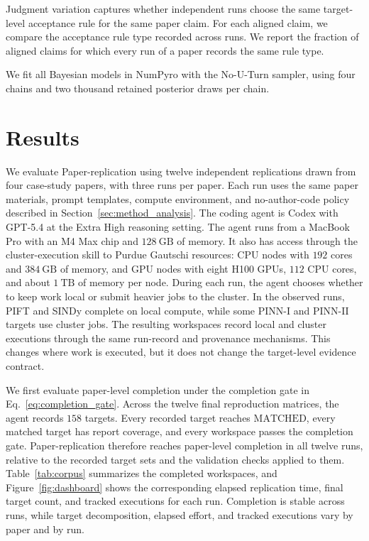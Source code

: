 \documentclass[authoryear,5p,times,nopreprintline]{elsarticle}
\begin{document}
Judgment variation captures whether independent runs choose the same target-level acceptance rule for the same paper claim.
For each aligned claim, we compare the acceptance rule type recorded across runs.
We report the fraction of aligned claims for which every run of a paper records the same rule type.

We fit all Bayesian models in NumPyro with the No-U-Turn sampler, using four chains and two thousand retained posterior draws per chain.

\section{Results}\label{sec:results}
We evaluate Paper-replication using twelve independent replications drawn from four case-study papers, with three runs per paper.
Each run uses the same paper materials, prompt templates, compute environment, and no-author-code policy described in Section~\ref{sec:method_analysis}.
The coding agent is Codex with GPT-5.4 at the Extra High reasoning setting.
The agent runs from a MacBook Pro with an M4 Max chip and \(128~\mathrm{GB}\) of memory.
It also has access through the cluster-execution skill to Purdue Gautschi resources: CPU nodes with \(192\) cores and \(384~\mathrm{GB}\) of memory, and GPU nodes with eight H100 GPUs, \(112\) CPU cores, and about \(1~\mathrm{TB}\) of memory per node.
During each run, the agent chooses whether to keep work local or submit heavier jobs to the cluster.
In the observed runs, PIFT and SINDy complete on local compute, while some PINN-I and PINN-II targets use cluster jobs.
The resulting workspaces record local and cluster executions through the same run-record and provenance mechanisms.
This changes where work is executed, but it does not change the target-level evidence contract.

We first evaluate paper-level completion under the completion gate in Eq.~\eqref{eq:completion_gate}.
Across the twelve final reproduction matrices, the agent records \(158\) targets.
Every recorded target reaches \(\mathrm{MATCHED}\), every matched target has report coverage, and every workspace passes the completion gate.
Paper-replication therefore reaches paper-level completion in all twelve runs, relative to the recorded target sets and the validation checks applied to them.
Table~\ref{tab:corpus} summarizes the completed workspaces, and Figure~\ref{fig:dashboard} shows the corresponding elapsed replication time, final target count, and tracked executions for each run.
Completion is stable across runs, while target decomposition, elapsed effort, and tracked executions vary by paper and by run.
\end{document}
